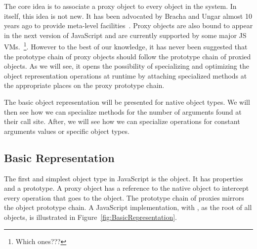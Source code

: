 The core idea is to associate a proxy object to every object in the system. In
itself, this idea is not new. It has been advocated by Bracha and Ungar almost
10 years ago to provide meta-level facilities~\cite{Bracha:2004vp}. Proxy
objects are also bound to appear in the next version of JavaScript and are
currently supported by some major JS VMs.~\footnote{Which ones???}. However to
the best of our knowledge, it has never been suggested that the prototype chain
of proxy objects should follow the prototype chain of proxied objects. As we
will see, it opens the possibility of specializing and optimizing the object
representation operations at runtime by attaching specialized methods at the
appropriate places on the proxy prototype chain.

The basic object representation will be presented for native object types. We
will then see how we can specialize methods for the number of arguments found
at their call site.  After, we will see how we can specialize operations for
constant arguments values or specific object types.

\subsection{Basic Representation}

The first and simplest object type in JavaScript is the object. It has
properties and a prototype. A proxy object has a reference to the native object
to intercept every operation that goes to the object. The prototype chain of
proxies mirrors the object prototype chain. A JavaScript implementation, with
, as the root of all objects, is illustrated in
Figure~\ref{fig:BasicRepresentation}.

